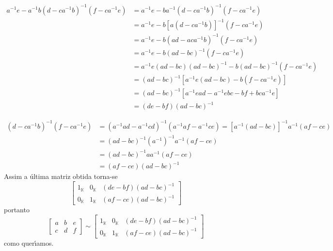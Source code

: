 \documentclass[12pt]{article}
\newcommand{\cp}[1]{\mathbb{#1}}
\begin{document}
\begin{align*}
    a^{-1}e - a^{-1}b(d - ca^{-1}b)^{-1}(f - ca^{-1}e) &= a^{-1}e - ba^{-1}(d - ca^{-1}b)^{-1}(f - ca^{-1}e)\\ &= a^{-1}e - b[a(d - ca^{-1}b)]^{-1}(f - ca^{-1}e)\\ &= a^{-1}e - b(ad - aca^{-1}b)^{-1}(f - ca^{-1}e) \\ &= a^{-1}e - b(ad - bc)^{-1}(f - ca^{-1}e)\\ &= a^{-1}e(ad - bc)(ad - bc)^{-1} - b(ad - bc)^{-1}(f - ca^{-1}e)\\ &= (ad - bc)^{-1}[a^{-1}e(ad - bc) - b(f - ca^{-1}e)]\\ &= (ad - bc)^{-1}[a^{-1}ead - a^{-1}ebc - bf + bca^{-1}e]\\ & = (de - bf)(ad - bc)^{-1}
\end{align*}

\begin{align*}
    (d - ca^{-1}b)^{-1}(f - ca^{-1}e) &= (a^{-1}ad - a^{-1}cd)^{-1}(a^{-1}af - a^{-1}ce) = [a^{-1}(ad - bc)]^{-1}a^{-1}(af - ce)\\ &= (ad - bc)^{-1}(a^{-1})^{-1}a^{-1}(af - ce)\\ &= (ad - bc)^{-1}aa^{-1}(af - ce)\\ &= (af - ce)(ad - bc)^{-1}
\end{align*}
Assim a \'ultima matriz obtida torna-se
\[
    \left[
        \begin{array}{cc|c}
            1_\cp{K} & 0_\cp{K} & (de - bf)(ad - bc)^{-1}\\
            0_\cp{K} & 1_\cp{K} & (af - ce)(ad - bc)^{-1}
        \end{array}
    \right]
\]
portanto
\[
    \left[\begin{array}{cc|c}
      a & b & e\\
      c & d & f
    \end{array}\right] \sim \left[\begin{array}{cc|c}
      1_{\cp{K}} & 0_{\cp{K}} & (de - bf)(ad - bc)^{-1}\\
      0_{\cp{K}} & 1_{\cp{K}} & (af - ce)(ad - bc)^{-1}
    \end{array}\right]
\]
como quer{\'\i}amos.
\end{document}

